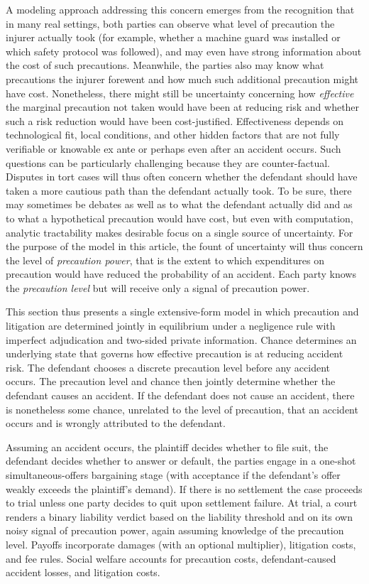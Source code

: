 \documentclass{article}
\begin{document}
A modeling approach addressing this concern emerges from the recognition that in many real settings, both parties can observe what level of precaution the injurer actually took (for example, whether a machine guard was installed or which safety protocol was followed), and may even have strong information about the cost of such precautions. Meanwhile, the parties also may know what precautions the injurer forewent and how much such additional precaution might have cost. Nonetheless, there might still be uncertainty concerning how \emph{effective} the marginal precaution not taken would have been at reducing risk and whether such a risk reduction would have been cost-justified. Effectiveness depends on technological fit, local conditions, and other hidden factors that are not fully verifiable or knowable ex ante or perhaps even after an accident occurs. Such questions can be particularly challenging because they are counter-factual. Disputes in tort cases will thus often concern whether the defendant should have taken a more cautious path than the defendant actually took. To be sure, there may sometimes be debates as well as to what the defendant actually did and as to what a hypothetical precaution would have cost, but even with computation, analytic tractability makes desirable focus on a single source of uncertainty. For the purpose of the model in this article, the fount of uncertainty will thus concern the level of \emph{precaution power}, that is the extent to which expenditures on precaution would have reduced the probability of an accident. Each party knows the \emph{precaution level} but will receive only a signal of precaution power. 

This section thus presents a single extensive-form model in which precaution and litigation are determined jointly in equilibrium under a negligence rule with imperfect adjudication and two-sided private information. Chance determines an underlying state that governs how effective precaution is at reducing accident risk. The defendant chooses a discrete precaution level before any accident occurs. The precaution level and chance then jointly determine whether the defendant causes an accident. If the defendant does not cause an accident, there is nonetheless some chance, unrelated to the level of precaution, that an accident occurs and is wrongly attributed to the defendant. 

Assuming an accident occurs, the plaintiff decides whether to file suit, the defendant decides whether to answer or default, the parties engage in a one-shot simultaneous-offers bargaining stage (with acceptance if the defendant’s offer weakly exceeds the plaintiff’s demand). If there is no settlement the case proceeds to trial unless one party decides to quit upon settlement failure. At trial, a court renders a binary liability verdict based on the liability threshold and on its own noisy signal of precaution power, again assuming knowledge of the precaution level. Payoffs incorporate damages (with an optional multiplier), litigation costs, and fee rules. Social welfare accounts for precaution costs, defendant-caused accident losses, and litigation costs. 
\end{document}
